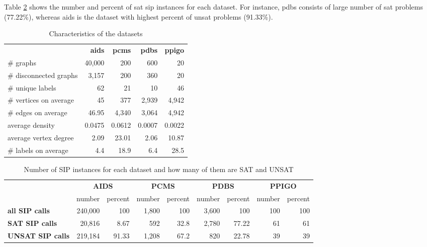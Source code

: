 \documentclass{l4proj}
\begin{document}
Table \ref{table:dataSAT} shows the number and percent of \gls{sat} \gls{sip} instances for each dataset. For instance, pdbs consists of large number of \gls{sat} problems (77.22\%), whereas aids is the dataset with highest percent of \gls{unsat} problems (91.33\%).

\begin{table}
\centering
        \renewcommand{\arraystretch}{1.4}%
        \begin{tabular}{l|r|r|r|r|}
\cline{2-5}
& \textbf{aids} & \textbf{pcms} & \textbf{pdbs} & \textbf{ppigo} \\
\cline{1-5}
\multicolumn{1}{|l|}{\# graphs}  & 40,000 & 200	& 600   & 20 \\
\hline
\multicolumn{1}{|l|}{\# disconnected graphs} & 3,157 & 200 & 360 & 20 \\
\hline
\multicolumn{1}{|l|}{\# unique labels} & 62 & 21 & 10 & 46 \\
\hline
\multicolumn{1}{|l|}{\# vertices on average} & 45 & 377 & 2,939 & 4,942 \\
\hline
\multicolumn{1}{|l|}{\# edges on average} & 46.95 & 4,340 & 3,064 & 4,942 \\
\hline
\multicolumn{1}{|l|}{average density} & 0.0475 & 0.0612 & 0.0007 & 0.0022 \\
\hline
\multicolumn{1}{|l|}{average vertex degree} & 2.09 & 23.01 & 2.06 & 10.87 \\
\hline
\multicolumn{1}{|l|}{\# labels on average} & 4.4 & 18.9 & 6.4 & 28.5 \\
\hline
\end{tabular}
\caption{Characteristics of the datasets}
\label{table:datasets}
\end{table}

\begin{table}
\centering
        \renewcommand{\arraystretch}{1.5}%
        \begin{tabular}{l|r|r|r|r|r|r|r|r|}
            \cline{2-9}
            &
             \multicolumn{2}{c}{\textbf{AIDS}} & 
             \multicolumn{2}{|c}{\textbf{PCMS}} & 
             \multicolumn{2}{|c|}{\textbf{PDBS}} & 
             \multicolumn{2}{c|}{\textbf{PPIGO}} \\
            \cline{2-9}
              & number  & percent & number & percent & number & percent & number & percent \\
              \hline
            \multicolumn{1}{|l|}{\textbf{all SIP calls}}  &240,000   &100 &1,800 &100 &3,600 &100 &100 &100 \\
            \multicolumn{1}{|l|}{\textbf{SAT SIP calls}}  &20,816 &8.67 &592 &32.8 &2,780 &77.22 &61 &61 \\
            \multicolumn{1}{|l|}{\textbf{UNSAT SIP calls}} &219,184 &91.33 &1,208 &67.2 &820 &22.78 &39 &39 \\
            \hline
        \end{tabular}
        \caption{Number of SIP instances for each dataset and how many of them are SAT and UNSAT}
        \label{table:dataSAT}
    \end{table}
\end{document}
